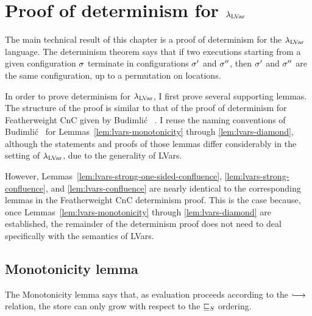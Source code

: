 \section{Proof of determinism for
  $\lambda_{\textrm{LVar}}$}\label{s:lvars-proof}

The main technical result of this chapter is a proof of determinism
for the $\lambda_{\textrm{LVar}}$ language.  The determinism theorem says that if
two executions starting from a given configuration $\sigma$ terminate
in configurations $\sigma'$ and $\sigma''$, then $\sigma'$ and $\sigma''$
are the same configuration, up to a permutation on locations.

In order to prove determinism for $\lambda_{\textrm{LVar}}$, I first prove several
supporting lemmas.  The structure of the proof is similar to that of
the proof of determinism for Featherweight CnC given by Budimli\'c
\etal~\cite{CnC}.  I reuse the naming conventions of Budimli\'c
\etal~for Lemmas~\ref{lem:lvars-monotonicity} through
\ref{lem:lvars-diamond}, although the statements and proofs of those
lemmas differ considerably in the setting of $\lambda_{\textrm{LVar}}$, due to the
generality of LVars.

However, Lemmas~\ref{lem:lvars-strong-one-sided-confluence},
\ref{lem:lvars-strong-confluence}, and \ref{lem:lvars-confluence} are
nearly identical to the corresponding lemmas in the Featherweight CnC
determinism proof.  This is the case because, once
Lemmas~\ref{lem:lvars-monotonicity} through \ref{lem:lvars-diamond}
are established, the remainder of the determinism proof does not need
to deal specifically with the semantics of LVars. 


\subsection{Monotonicity lemma}

The Monotonicity lemma says that, as evaluation proceeds according to
the $\parstepsto$ relation, the store can only grow with respect to
the $ \sqsubseteq_S $ ordering.

